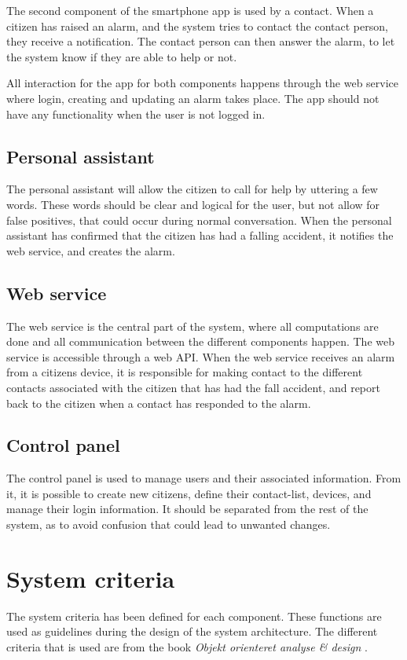The second component of the smartphone app is used by a contact. When a citizen has raised an alarm, and the system tries to contact the contact person, they receive a notification. The contact person can then answer the alarm, to let the system know if they are able to help or not. 

All interaction for the app for both components happens through the web service where login, creating and updating an alarm takes place. The app should not have any functionality when the user is not logged in.

\subsection{Personal assistant}\label{sec:personalAssistant}
The personal assistant will allow the citizen to call for help by uttering a few words. These words should be clear and logical for the user, but not allow for false positives, that could occur during normal conversation. When the personal assistant has confirmed that the citizen has had a falling accident, it notifies the web service, and creates the alarm. 

\subsection{Web service}
The web service is the central part of the system, where all computations are done and all communication between the different components happen. The web service is accessible through a web API. When the web service receives an alarm from a citizens device, it is responsible for making contact to the different contacts associated with the citizen that has had the fall accident, and report back to the citizen when a contact has responded to the alarm.

\subsection{Control panel}
The control panel is used to manage users and their associated information. From it, it is possible to create new citizens, define their contact-list, devices, and manage their login information. It should be separated from the rest of the system, as to avoid confusion that could lead to unwanted changes.

\section{System criteria}
\label{sec:non-requirements}
The system criteria has been defined for each component. These functions are used as guidelines during the design of the system architecture. The different criteria that is used are from the book \textit{Objekt orienteret analyse \& design} \cite{subook}.


